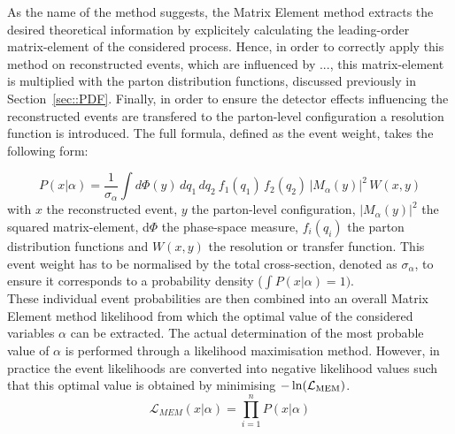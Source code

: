 As the name of the method suggests, the Matrix Element method extracts the desired theoretical information by explicitely calculating the leading-order matrix-element of the considered process.
Hence, in order to correctly apply this method on reconstructed events, which are influenced by ..., this matrix-element is multiplied with the parton distribution functions, discussed previously in Section~\ref{sec::PDF}. %
Finally, in order to ensure the detector effects influencing the reconstructed events are transfered to the parton-level configuration a resolution function is introduced.
The full formula, defined as the event weight, takes the following form:

\begin{equation} \label{eq::MWEvtProb}
 P(x \vert \alpha) = \frac{1}{\sigma_{\alpha}} \int d\Phi(y) \, dq_{1} \, dq_{2} ~ f_{1}(q_{1}) \, f_{2}(q_{2}) \, \vert M_{\alpha}(y) \vert^{2} \, W(x,y)
\end{equation}
with $x$ the reconstructed event, $y$ the parton-level configuration, $\vert M_{\alpha}(y) \vert^{2}$ the squared matrix-element, d$\Phi$ the phase-space measure, $f_{i}(q_{i})$ the parton distribution functions and $W(x,y)$ the resolution or transfer function.
This event weight has to be normalised by the total cross-section, denoted as $\sigma_{\alpha}$, to ensure it corresponds to a probability density ($\int P(x \vert \alpha) = 1)$.
\\

These individual event probabilities are then combined into an overall Matrix Element method likelihood from which the optimal value of the considered variables $\alpha$ can be extracted.
The actual determination of the most probable value of $\alpha$ is performed through a likelihood maximisation method. However, in practice the event likelihoods are converted into negative likelihood values such that this optimal value is obtained by minimising $-\ln(\mathcal{L}_{\textrm{MEM}})$. 
\\
\begin{equation}
 \mathcal{L}_{MEM}(x \vert \alpha) = \prod_{i=1}^{n} P(x \vert \alpha)
\end{equation}

